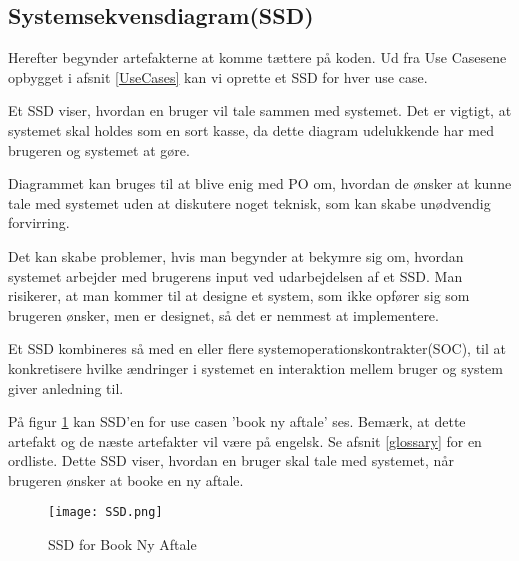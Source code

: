 \subsection{Systemsekvensdiagram(SSD)}

Herefter begynder artefakterne at komme tættere på koden.
Ud fra Use Casesene opbygget i afsnit \ref{UseCases} kan vi oprette et SSD for hver use case.

Et SSD viser, hvordan en bruger vil tale sammen med systemet.
Det er vigtigt, at systemet skal holdes som en sort kasse, da dette diagram udelukkende har med brugeren og systemet at gøre.

Diagrammet kan bruges til at blive enig med PO om, hvordan de ønsker at kunne tale med systemet uden at diskutere noget teknisk, som kan skabe unødvendig forvirring.

Det kan skabe problemer, hvis man begynder at bekymre sig om, hvordan systemet arbejder med brugerens input ved udarbejdelsen af et SSD.
Man risikerer, at man kommer til at designe et system, som ikke opfører sig som brugeren ønsker, men er designet, så det er nemmest at implementere.

Et SSD kombineres så med en eller flere systemoperationskontrakter(SOC), til at konkretisere hvilke ændringer i systemet en interaktion mellem bruger og system giver anledning til.

På figur \ref{forretning:ssd} kan SSD'en for use casen 'book ny aftale' ses.
Bemærk, at dette artefakt og de næste artefakter vil være på engelsk.
Se afsnit \ref{glossary} for en ordliste.
Dette SSD viser, hvordan en bruger skal tale med systemet, når brugeren ønsker at booke en ny aftale.

\begin{figure}[H]
    \caption{SSD for Book Ny Aftale}
    \centering
        \texttt{[image: SSD.png]}
    \label{forretning:ssd}
\end{figure}
